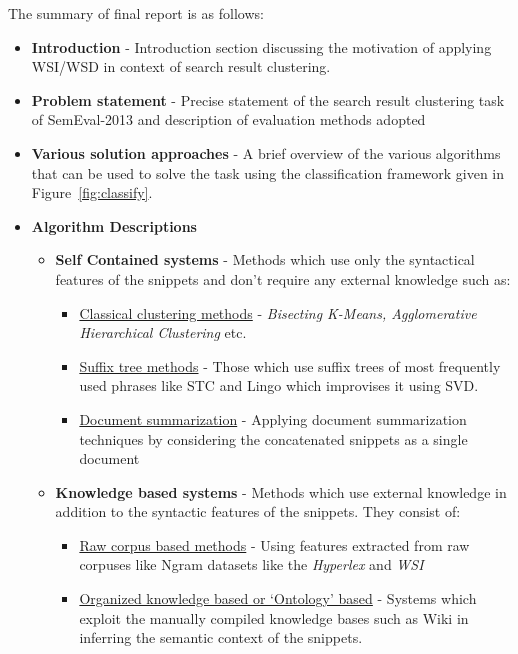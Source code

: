 \documentclass[a4paper,12pt]{article}
\begin{document}
The summary of final report is as follows:
\begin{itemize}
 \item {\bf Introduction} - Introduction section discussing the
   motivation of applying WSI/WSD in context of search result
   clustering. 
 \item {\bf Problem statement} - Precise statement of the search
   result clustering task of SemEval-2013 and description of
   evaluation methods adopted
 \item {\bf Various solution approaches} - A brief overview of the
   various algorithms that can be used to solve the task using the
   classification framework given in
   Figure~\ref{fig:classify}.
 \item {\bf Algorithm Descriptions}
   \begin{itemize}
     \item {\bf Self Contained systems} - Methods which use only the
       syntactical features of the snippets and don't require any
       external knowledge such as:
       \begin{itemize}
         \item \underline{Classical clustering methods} - {\it
           Bisecting K-Means, Agglomerative Hierarchical Clustering}
           etc. \cite{clusteringCompare}
         \item \underline{Suffix tree methods} - Those which use suffix trees of
           most frequently used phrases like STC\cite{Zamir} and
           Lingo\cite{Weiss} which improvises it using SVD.
         \item \underline{Document summarization} - Applying document
           summarization techniques by considering the concatenated
           snippets as a single document \cite{Bilmes}
       \end{itemize}
    \item {\bf Knowledge based systems} - Methods which use external
      knowledge in addition to the syntactic features of the
      snippets. They consist of:
    \begin{itemize}
      \item \underline{Raw corpus based methods} - Using features extracted from
        raw corpuses like Ngram datasets like the {\it Hyperlex}
        \cite{hyperlex} and {\it WSI} \cite{navigli}
      \item \underline{Organized knowledge based or `Ontology' based} - Systems
        which exploit the manually compiled knowledge bases such as
        Wiki in inferring the semantic context of the snippets.

\end{itemize}
\end{itemize}
\end{itemize}
\end{document}
